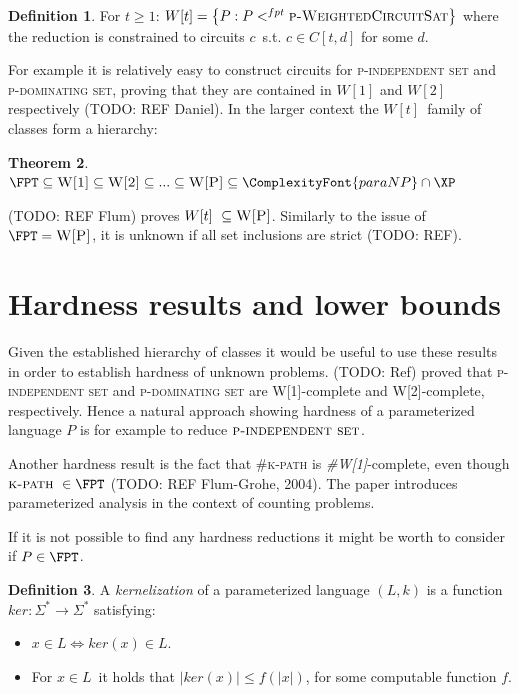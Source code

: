 \documentclass[a4paper,11pt]{report}
\theoremstyle{plain}
\newtheorem{thm}{Theorem}[chapter] %
\theoremstyle{definition}
\newtheorem{defn}[thm]{Definition} %
\newcommand{\PARANP}{\ComplexityFont{paraNP}}
\begin{document}
\begin{defn}
For $t \ge 1$: $W[t] = \left\{P : P <^{fpt} \textsc{p-WeightedCircuitSat} \right\}$ where the reduction is constrained to circuits $c$ s.t. $c \in C[t, d]$ for some $d$.
\end{defn}

For example it is relatively easy to construct circuits for \textsc{p-independent set} and \textsc{p-dominating set}, proving that they are contained in $W[1]$ and $W[2]$ respectively (TODO: REF Daniel).
In the larger context the $W[t]$ family of classes form a hierarchy:

\begin{thm}
$\FPT \subseteq \textsc{W[1]} \subseteq \textsc{W[2]} \subseteq ...  \subseteq \textsc{W[P]} \subseteq \PARANP \cap \XP$
\end{thm}

(TODO: REF Flum) proves $W[t] \subseteq \textsc{W[P]}$.
Similarly to the issue of $\FPT = \textsc{W[P]}$, it is unknown if all set inclusions are strict (TODO: REF).

\section{Hardness results and lower bounds}
Given the established hierarchy of classes it would be useful to use these results in order to establish hardness of unknown problems.
(TODO: Ref) proved that \textsc{p-independent set} and \textsc{p-dominating set} are \textsc{W[1]}-complete and \textsc{W[2]}-complete, respectively.
Hence a natural approach showing hardness of a parameterized language $P$ is for example to reduce $\textsc{p-independent set}$.

Another hardness result is the fact that \textsc{\#k-path} is \emph{\#W[1]}-complete, even though $\textsc{k-path} \in \FPT$ (TODO: REF Flum-Grohe, 2004).
The paper introduces parameterized analysis in the context of counting problems.

If it is not possible to find any hardness reductions it might be worth to consider if $P \in \FPT$.

\begin{defn}
A \emph{kernelization} of a parameterized language $(L, k)$ is a function $ker : \Sigma^* \rightarrow \Sigma^*$ satisfying:
\begin{itemize}
\item $x \in L \Leftrightarrow ker(x) \in L$.
\item For $x \in L$ it holds that $|ker(x)| \leq f(|x|)$, for some computable function $f$.
\end{itemize}
\end{defn}
\end{document}
